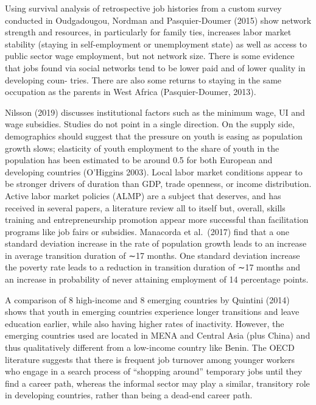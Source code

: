 \documentclass[
  a4paper, twoside, 12pt]{book}
\begin{document}
Using survival analysis of retrospective job histories from a custom survey conducted in Oudgadougou, Nordman and Pasquier-Doumer (2015) show network strength and resources, in particularly for family ties, increases labor market stability (staying in self-employment or unemployment state) as well as access to public sector wage employment, but not network size. There is some evidence that jobs found via social networks tend to be lower paid and of lower quality in developing coun- tries. There are also some returns to staying in the same occupation as the parents in West Africa (Pasquier-Doumer, 2013).

Nilsson (2019) discusses institutional factors such as the minimum wage, UI and wage subsidies. Studies do not point in a single direction. On the supply side, demographics should suggest that the pressure on youth is easing as population growth slows; elasticity of youth employment to the share of youth in the population has been estimated to be around 0.5 for both European and developing countries (O'Higgins 2003). Local labor market conditions appear to be stronger drivers of duration than GDP, trade openness, or income distribution. Active labor market policies (ALMP) are a subject that deserves, and has received in several papers, a literature review all to itself but, overall, skills training and entrepreneurship promotion appear more successful than facilitation programs like job fairs or subsidies. Manacorda et al.~(2017) find that a one standard deviation increase in the rate of population growth leads to an increase in average transition duration of ∼17 months. One standard deviation increase the poverty rate leads to a reduction in transition duration of ∼17 months and an increase in probability of never attaining employment of 14 percentage points.

A comparison of 8 high-income and 8 emerging countries by Quintini (2014) shows that youth in emerging countries experience longer transitions and leave education earlier, while also having higher rates of inactivity. However, the emerging countries used are located in MENA and Central Asia (plus China) and thus qualitatively different from a low-income country like Benin. The OECD literature suggests that there is frequent job turnover among younger workers who engage in a search process of ``shopping around'' temporary jobs until they find a career path, whereas the informal sector may play a similar, transitory role in developing countries, rather than being a dead-end career path.
\end{document}
